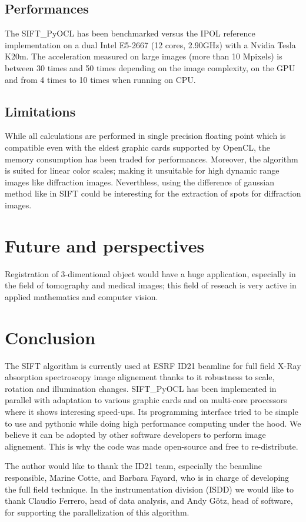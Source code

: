 \documentclass[preprint]{iucr}
\begin{document}
\subsection{Performances}

The SIFT\_PyOCL has been benchmarked versus the IPOL reference implementation on
a dual Intel E5-2667 (12 cores, 2.90GHz) with a Nvidia Tesla K20m. The
acceleration measured on large images (more than 10 Mpixels) is between 30 times
and 50 times depending on the image complexity, on the GPU and from 4 times to
10 times when running on CPU.

\subsection{Limitations}
While all calculations are performed in single precision floating point which is
compatible even with the eldest graphic cards supported by OpenCL, the
memory consumption has been traded for performances. 
Moreover, the algorithm is suited
for linear color scales; making it unsuitable for high dynamic range
images like diffraction images.
Neverthless, using the difference of gaussian method like in
SIFT could be interesting for the extraction of spots for diffraction
images.


\section{Future and perspectives}

Registration of 3-dimentional object would have a huge application, especially
in the field of tomography and medical images; this field of reseach is very
active in applied mathematics and computer vision.


\section{Conclusion}

The SIFT algorithm is currently used at ESRF ID21 beamline for full field X-Ray
absorption spectroscopy image alignement thanks to it robustness to scale,
rotation and illumination changes. 
SIFT\_PyOCL has been implemented in parallel with adaptation to various
graphic cards and on multi-core processors where it shows interesing speed-ups.
Its programming interface tried to be simple to use and pythonic while doing
high performance computing under the hood. We believe it can be adopted by other
software developers to perform image alignement. This is why the code was made
open-source and free to re-distribute.



The author would like to thank the ID21 team, especially the beamline
responsible, Marine Cotte, and Barbara Fayard, who is in charge of developing
the full field technique.
In the instrumentation division (ISDD) we would like to thank Claudio Ferrero,
head of data analysis, and Andy G\"otz, head of software, for supporting the
parallelization of this algorithm.



\end{document}
